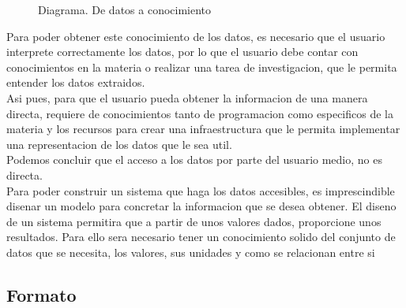 \begin{figure}[h]
    \centering 
      \caption{Diagrama. De datos a conocimiento}
    \end{figure}
 
Para poder obtener este conocimiento de los datos, es necesario que el usuario interprete correctamente los datos, por lo
que el usuario debe contar con conocimientos en la materia o realizar una tarea de investigacion, que le permita 
entender los datos extraidos. \\

Asi pues, para que el usuario pueda obtener la informacion de una manera directa, requiere de conocimientos tanto 
de programacion como especificos de la materia y los recursos para crear una infraestructura que le permita implementar 
una representacion de los datos que le sea util.\\

Podemos concluir que el acceso a los datos por parte del usuario medio, no es directa.\\

Para poder construir un sistema que haga los datos accesibles, es imprescindible disenar un modelo  para concretar la 
informacion que se desea obtener. El diseno de un sistema permitira que a partir de unos valores dados, proporcione unos resultados.
Para ello sera necesario tener un conocimiento solido del conjunto de datos que se necesita, los valores,
sus unidades y como se relacionan entre si\\
    
\subsection{Formato}

